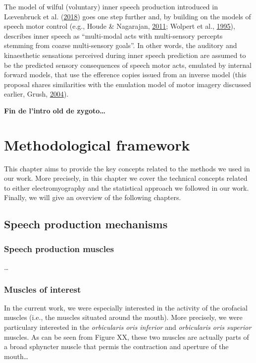 \documentclass[a4paper,12pt,twoside,openright,oldfontcommands]{memoir}
\begin{document}
The model of wilful (voluntary) inner speech production introduced in
Lœvenbruck et al.
(\protect\hyperlink{ref-loevenbruck_cognitive_2018}{2018}) goes one step
further and, by building on the models of speech motor control (e.g.,
Houde \& Nagarajan, \protect\hyperlink{ref-houde_speech_2011}{2011};
Wolpert et al., \protect\hyperlink{ref-wolpert_internal_1995}{1995}),
describes inner speech as ``multi-modal acts with multi-sensory percepts
stemming from coarse multi-sensory goals''. In other words, the auditory
and kinaesthetic sensations perceived during inner speech prediction are
assumed to be the predicted sensory consequences of speech motor acts,
emulated by internal forward models, that use the efference copies
issued from an inverse model (this proposal shares similarities with the
emulation model of motor imagery discussed earlier, Grush,
\protect\hyperlink{ref-grush_emulation_2004}{2004}).

\textbf{Fin de l'intro old de zygoto\ldots{}}

\chapter{Methodological framework}\label{methodological-framework}

This chapter aims to provide the key concepts related to the methods we
used in our work. More precisely, in this chapter we cover the technical
concepts related to either electromyography and the statistical approach
we followed in our work. Finally, we will give an overview of the
following chapters.

\section{Speech production
mechanisms}\label{speech-production-mechanisms}

\subsection{Speech production muscles}\label{speech-production-muscles}

\ldots{}

\subsection{Muscles of interest}\label{muscles-of-interest}

In the current work, we were especially interested in the activity of
the orofacial muscles (i.e., the muscles situated around the mouth).
More precisely, we were particulary interested in the \emph{orbicularis
oris inferior} and \emph{orbicularis oris superior} muscles. As can be
seen from Figure XX, these two muscles are actually parts of a broad
sphyncter muscle that permis the contraction and aperture of the
mouth\ldots{}
\end{document}
